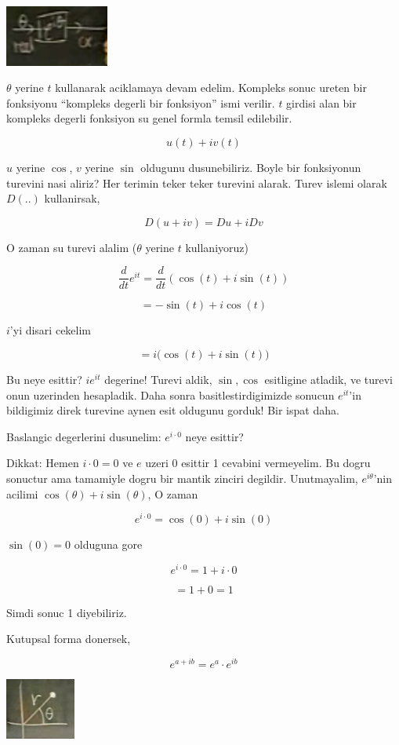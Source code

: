 \documentclass[12pt,fleqn]{article}\usepackage{../common}
\begin{document}
\includegraphics[height=2cm]{6_3.png}

$\theta$ yerine $t$ kullanarak aciklamaya devam edelim. Kompleks sonuc
ureten bir fonksiyonu ``kompleks degerli bir fonksiyon'' ismi verilir. $t$
girdisi alan bir kompleks degerli fonksiyon su genel formla temsil
edilebilir. 

\[ u(t) + iv(t) \]

$u$ yerine $\cos$, $v$ yerine $\sin$ oldugunu dusunebiliriz. Boyle bir
fonksiyonun turevini nasi aliriz? Her terimin teker teker turevini
alarak. Turev islemi olarak $D(..)$ kullanirsak,

\[ D(u+iv) = Du + iDv \]

O zaman su turevi alalim ($\theta$ yerine $t$ kullaniyoruz) 

\[ \frac{d}{dt}e^{it} = \frac{d}{dt}(\cos(t) + i\sin(t)) \]

\[ = -\sin(t) + i\cos(t) \]

$i$'yi disari cekelim

\[ = i \bigg( \cos(t) + i\sin(t) \bigg) \]

Bu neye esittir? $ie^{it}$ degerine! Turevi aldik, $\sin, \cos$ esitligine
atladik, ve turevi onun uzerinden hesapladik. Daha sonra
basitlestirdigimizde sonucun $e^{it}$'in bildigimiz direk turevine aynen
esit oldugunu gorduk! Bir ispat daha. 

Baslangic degerlerini dusunelim: $e^{i\cdot 0}$ neye esittir? 

Dikkat: Hemen $i \cdot 0 = 0$ ve $e$ uzeri $0$ esittir 1 cevabini
vermeyelim. Bu dogru sonuctur ama tamamiyle dogru bir mantik zinciri
degildir. Unutmayalim, $e^{i\theta}$'nin acilimi $\cos(\theta) +
i\sin(\theta)$, O zaman

\[ e^{i \cdot 0} = \cos(0) + i\sin(0) \]

$\sin(0) = 0$ olduguna gore

\[ e^{i \cdot 0} = 1 + i \cdot 0 \]

\[ = 1 +  0  = 1\]

Simdi sonuc 1 diyebiliriz.

Kutupsal forma donersek, 

\[ e^{a+ib}  = e^a \cdot e^{ib}\]

\includegraphics[height=2cm]{6_4.png}
\end{document}

